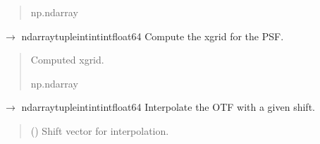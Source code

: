 \documentclass[letterpaper,10pt,english]{sphinxmanual}
\begin{document}
\begin{fulllineitems}
\begin{fulllineitems}
\begin{quote}
\begin{description}
\sphinxAtStartPar
np.ndarray

\end{description}\end{quote}

\end{fulllineitems}


\begin{fulllineitems}
\label{\detokenize{source/OpticalSystems:OpticalSystems.OpticalSystem.compute_x_grid}}
\pysigstartsignatures
\pysiglinewithargsret
{}
{}
{{ $\rightarrow$ ndarray\DUrole{p}{{[}}tuple\DUrole{p}{{[}}intintint\DUrole{p}{{]}}float64\DUrole{p}{{]}}}}
\pysigstopsignatures
\sphinxAtStartPar
Compute the x\sphinxhyphen{}grid for the PSF.
\begin{quote}\begin{description}
\sphinxAtStartPar
Computed x\sphinxhyphen{}grid.

\sphinxAtStartPar
np.ndarray

\end{description}\end{quote}

\end{fulllineitems}


\begin{fulllineitems}
\label{\detokenize{source/OpticalSystems:OpticalSystems.OpticalSystem.interpolate_otf}}
\pysigstartsignatures
\pysiglinewithargsret
{}
{}
{{ $\rightarrow$ ndarray\DUrole{p}{{[}}tuple\DUrole{p}{{[}}intintint\DUrole{p}{{]}}float64\DUrole{p}{{]}}}}
\pysigstopsignatures
\sphinxAtStartPar
Interpolate the OTF with a given shift.
\begin{quote}\begin{description}
\sphinxAtStartPar
{} () \textendash{} Shift vector for interpolation.


\end{description}
\end{quote}
\end{fulllineitems}
\end{fulllineitems}
\end{document}
